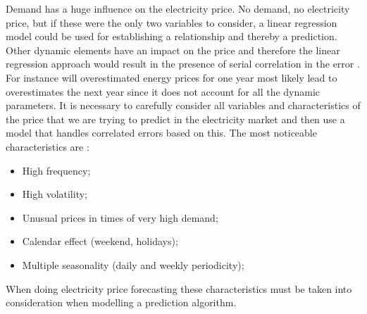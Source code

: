 Demand has a huge influence on the electricity price. No demand, no electricity price, but if these were the only two variables to consider, a linear regression model could be used for establishing a relationship and thereby a prediction. Other dynamic elements have an impact on the price and therefore the linear regression approach would result in the presence of serial correlation in the error \cite{21}. For instance will overestimated energy prices for one year most likely lead to overestimates the next year since it does not account for all the dynamic parameters. It is necessary to carefully consider all variables and characteristics of the price that we are trying to predict in the electricity market and then use a model that handles correlated errors based on this. The most noticeable characteristics are \cite{21}:
\begin{itemize}
\item High frequency;
\item High volatility;
\item Unusual prices in times of very high demand;
\item Calendar effect (weekend, holidays);
\item Multiple seasonality (daily and weekly periodicity);
\end{itemize}
When doing electricity price forecasting these characteristics must be taken into consideration when modelling a prediction algorithm. 

